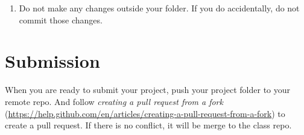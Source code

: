\documentclass[]{book}
\providecommand{\tightlist}{%
  \setlength{\itemsep}{0pt}\setlength{\parskip}{0pt}}
\begin{document}
\begin{enumerate}
\def\labelenumi{\arabic{enumi}.}
\setcounter{enumi}{1}
\tightlist
\item
  Do not make any changes outside your folder. If you do accidentally, do not commit those changes.
\end{enumerate}

\hypertarget{submission}{%
\section{Submission}\label{submission}}

When you are ready to submit your project, push your project folder to your remote repo. And follow \emph{creating a pull request from a fork} (\url{https://help.github.com/en/articles/creating-a-pull-request-from-a-fork}) to create a pull request. If there is no conflict, it will be merge to the class repo.
\end{document}
